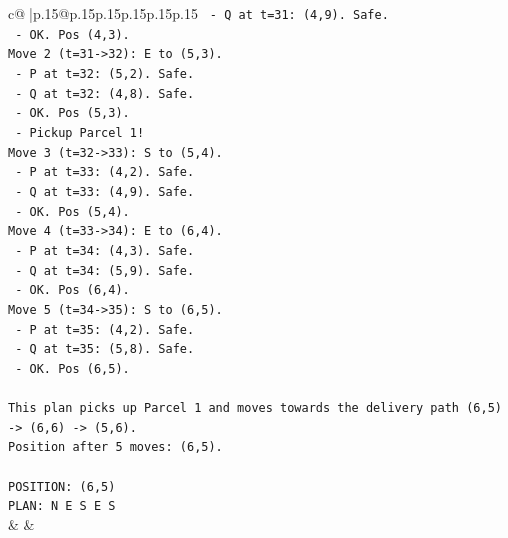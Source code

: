 \documentclass{article}
\begin{document}
{\begin{supertabular}{c@{$\;$}|p{.15\linewidth}@{}p{.15\linewidth}p{.15\linewidth}p{.15\linewidth}p{.15\linewidth}p{.15\linewidth}}
{{{\texttt{  {-} Q at t=31: (4,9). Safe.} \\
\texttt{  {-} OK. Pos (4,3).} \\
\texttt{Move 2 (t=31{-}>32): E to (5,3).} \\
\texttt{  {-} P at t=32: (5,2). Safe.} \\
\texttt{  {-} Q at t=32: (4,8). Safe.} \\
\texttt{  {-} OK. Pos (5,3).} \\
\texttt{  {-} Pickup Parcel 1!} \\
\texttt{Move 3 (t=32{-}>33): S to (5,4).} \\
\texttt{  {-} P at t=33: (4,2). Safe.} \\
\texttt{  {-} Q at t=33: (4,9). Safe.} \\
\texttt{  {-} OK. Pos (5,4).} \\
\texttt{Move 4 (t=33{-}>34): E to (6,4).} \\
\texttt{  {-} P at t=34: (4,3). Safe.} \\
\texttt{  {-} Q at t=34: (5,9). Safe.} \\
\texttt{  {-} OK. Pos (6,4).} \\
\texttt{Move 5 (t=34{-}>35): S to (6,5).} \\
\texttt{  {-} P at t=35: (4,2). Safe.} \\
\texttt{  {-} Q at t=35: (5,8). Safe.} \\
\texttt{  {-} OK. Pos (6,5).} \\
\\ 
\texttt{This plan picks up Parcel 1 and moves towards the delivery path (6,5) {-}> (6,6) {-}> (5,6).} \\
\texttt{Position after 5 moves: (6,5).} \\
\\ 
\texttt{POSITION: (6,5)} \\
\texttt{PLAN: N E S E S} \\
            }
        }
    }
    & & \\ \\


\end{supertabular}}
\end{document}
